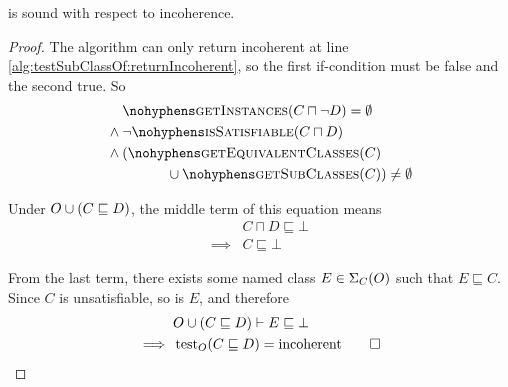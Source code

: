 \documentclass[paper.tex]{subfiles}
\begin{document}
\begin{lemma}
  \label{lem:testSubClassOfIncoherentSound}
   is sound with respect to incoherence.
\end{lemma}
\begin{proof}
  The algorithm can only return incoherent at line \ref{alg:testSubClassOf:returnIncoherent}, so the first if-condition must be false and the second true.  So
  \begin{equation*}
    \label{eqn:testSubClassOfIncoherent}
    \begin{aligned}[b]
      & \textproc{getInstances}(C \sqcap \neg D) = \emptyset \\
      {}\land{}& \neg \textproc{isSatisfiable}(C \sqcap D) \\
      {}\land{}& \begin{aligned}[t]
        (\textproc{getEquivalentClasses}(C)& \\
        {} \union \textproc{getSubClasses}(C)&) \ne \emptyset
      \end{aligned}
    \end{aligned}
  \end{equation*}

  Under $O \cup (C \sqsubseteq D)$, the middle term of this equation means
  \begin{align*}
    & C \sqcap D \sqsubseteq \bot \\
    \implies{}& C \sqsubseteq \bot
  \end{align*}

  From the last term, there exists some named class $E \in \Sigma_C(O)$ such that $E \sqsubseteq C$.  Since $C$ is unsatisfiable, so is $E$, and therefore
  \begin{align*}
    & O \cup (C \sqsubseteq D) \vdash E \sqsubseteq \bot \\
    \implies{}& \operatorname{test}_O(C \sqsubseteq D) = \mathrm{incoherent}
    \qed
  \end{align*}
\end{proof}
\end{document}
